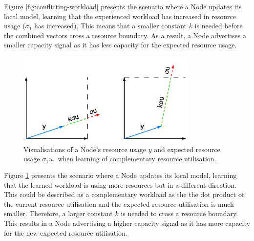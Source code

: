 Figure \ref{fig:conflicting-workload} presents the scenario where a Node updates
its local model, learning that the experienced workload has increased in
resource usage ($\sigma_1$ has increased). This means that a smaller constant
$k$ is needed before the combined vectors cross a resource boundary. As a
result, a Node advertises a smaller capacity signal as it has less capacity for
the expected resource usage.

\begin{figure}[H]
    \centering
    \includegraphics[width=0.8\textwidth]{images/complementary-workload.pdf}
    \caption{Visualisations of a Node's resource usage $y$ and expected resource
    usage $\sigma_1 u_1$ when learning of complementary resource utilisation.}
    \label{fig:complementary-workload}
\end{figure}

Figure \ref{fig:complementary-workload} presents the scenario where a Node updates
its local model, learning that the learned workload is using more resources but
in a different direction. This could be described as a complementary workload as
the the dot product of the current resource utilisation and the expected
resource utilisation is much smaller. Therefore, a larger constant $k$ is needed
to cross a resource boundary. This results in a Node advertising a higher
capacity signal as it has more capacity for the new expected resource
utilisation.

